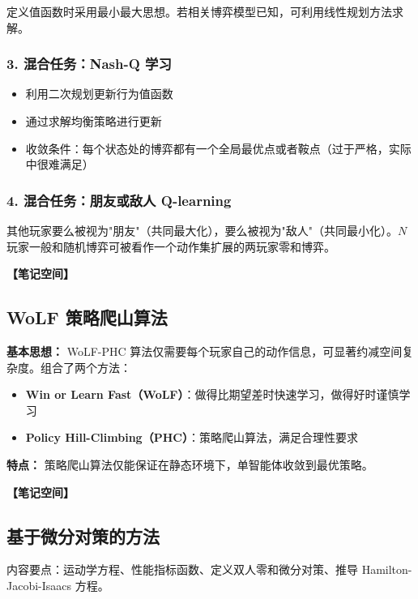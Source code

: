 \documentclass[12pt,a4paper]{article}
\newcommand{\notespace}[1][3cm]{%
  \vspace{#1}%
  \noindent\textbf{【笔记空间】}%
  \vspace{#1}%
}
\newcommand{\1}{\mathbf{1}}
\begin{document}
定义值函数时采用最小最大思想。若相关博弈模型已知，可利用线性规划方法求解。

\subsubsection*{3. 混合任务：Nash-Q 学习}

\begin{itemize}[leftmargin=2em]
  \item 利用二次规划更新行为值函数
  \item 通过求解均衡策略进行更新
  \item 收敛条件：每个状态处的博弈都有一个全局最优点或者鞍点（过于严格，实际中很难满足）
\end{itemize}

\subsubsection*{4. 混合任务：朋友或敌人 Q-learning}

其他玩家要么被视为"朋友"（共同最大化），要么被视为"敌人"（共同最小化）。$N$ 玩家一般和随机博弈可被看作一个动作集扩展的两玩家零和博弈。

\notespace[2cm]

\subsection{WoLF 策略爬山算法}

\begin{keybox}
\textbf{基本思想：} WoLF-PHC 算法仅需要每个玩家自己的动作信息，可显著约减空间复杂度。组合了两个方法：
\begin{itemize}[leftmargin=1.5em]
  \item \textbf{Win or Learn Fast（WoLF）}：做得比期望差时快速学习，做得好时谨慎学习
  \item \textbf{Policy Hill-Climbing（PHC）}：策略爬山算法，满足合理性要求
\end{itemize}
\end{keybox}

\textbf{特点：} 策略爬山算法仅能保证在静态环境下，单智能体收敛到最优策略。

\notespace[2cm]

\subsection{基于微分对策的方法}

内容要点：运动学方程、性能指标函数、定义双人零和微分对策、推导 Hamilton-Jacobi-Isaacs 方程。
\end{document}

